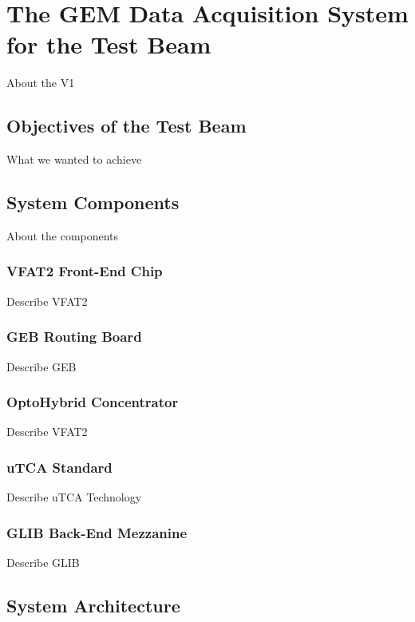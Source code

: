 \chapter{The GEM Data Acquisition System for the Test Beam}
\label{chap:gem_daq_test_beam}

    About the V1

    \section{Objectives of the Test Beam}

        What we wanted to achieve

    \section{System Components}

        About the components

        \subsection{VFAT2 Front-End Chip}

            Describe VFAT2

        \subsection{GEB Routing Board}

            Describe GEB

        \subsection{OptoHybrid Concentrator}

            Describe VFAT2

        \subsection{uTCA Standard}

            Describe uTCA Technology

        \subsection{GLIB Back-End Mezzanine}

            Describe GLIB

    \section{System Architecture}

